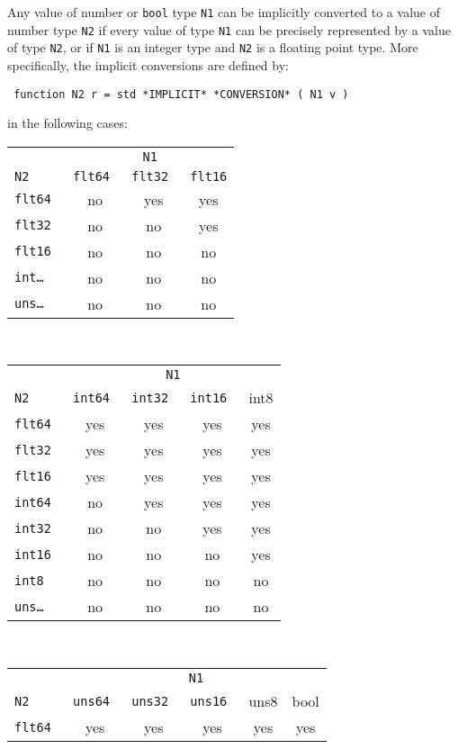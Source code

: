 \documentclass[12pt]{article}
\newenvironment{indpar}[1][0.3in]%
	{\begin{list}{}%
		     {\setlength{\itemsep}{0in}%
		      \setlength{\topsep}{0in}%
		      \setlength{\parsep}{1ex}%
		      \setlength{\labelwidth}{#1}%
		      \setlength{\leftmargin}{#1}%
		      \addtolength{\leftmargin}{\labelsep}}%
	 \item}%
	{\end{list}}
\begin{document}
Any value of number or {\tt bool} type {\tt N1}
can be implicitly converted to a value
of number type {\tt N2} if every value of type {\tt N1} can be
precisely represented by a value of type {\tt N2}, or if {\tt N1} is
an integer type and {\tt N2}
is a floating point type.  More specifically,
the implicit conversions are defined by:
\begin{indpar} \tt
function N2 r = std *IMPLICIT* *CONVERSION* ( N1 v )
\end{indpar}
in the following cases:
\begin{center}
\begin{tabular}{l|c|c|c|}
\multicolumn{1}{c}{}	& \multicolumn{3}{c}{\tt N1} \\
\tt N2  & \tt flt64 & \tt flt32 & \tt flt16
\\\hline
\tt flt64 & no & yes & yes \\
\tt flt32 & no & no & yes \\
\tt flt16 & no & no & no
\\\hline
\tt int\ldots{} & no & no & no \\
\tt uns\ldots{} & no & no & no
\\\hline
\end{tabular}
\\[2ex]
\begin{tabular}{l|c|c|c|c|}
\multicolumn{1}{c}{}	& \multicolumn{4}{c}{\tt N1} \\
\tt N2  & \tt int64 & \tt int32 & \tt int16 & int8
\\\hline
\tt flt64 & yes & yes & yes & yes \\
\tt flt32 & yes & yes & yes & yes \\
\tt flt16 & yes & yes & yes & yes
\\\hline
\tt int64 & no & yes & yes & yes \\
\tt int32 & no & no & yes & yes \\
\tt int16 & no & no & no & yes \\
\tt int8 & no & no & no & no
\\\hline
\tt uns\ldots{} & no & no & no & no
\\\hline
\end{tabular}
\\[2ex]
\begin{tabular}{l|c|c|c|c|c|}
\multicolumn{1}{c}{}	& \multicolumn{5}{c}{\tt N1} \\
\tt N2  & \tt uns64 & \tt uns32 & \tt uns16 & uns8 & bool
\\\hline
\tt flt64 & yes & yes & yes & yes & yes \\

\end{tabular}
\end{center}
\end{document}
